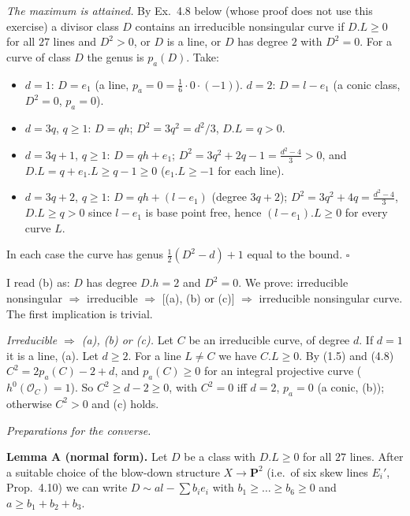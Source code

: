 \documentclass[11pt]{article}
\begin{document}
\emph{The maximum is attained.} By Ex.~4.8 below (whose proof does not use this exercise) a divisor class $D$ contains an irreducible nonsingular curve if $D.L\ge0$ for all $27$ lines and $D^2>0$, or $D$ is a line, or $D$ has degree $2$ with $D^2=0$. For a curve of class $D$ the genus is $p_a(D)$. Take:
\begin{itemize}
\item $d=1$: $D=e_1$ (a line, $p_a=0=\frac16\cdot0\cdot(-1)$). $d=2$: $D=l-e_1$ (a conic class, $D^2=0$, $p_a=0$).
\item $d=3q$, $q\ge1$: $D=qh$; $D^2=3q^2=d^2/3$, $D.L=q>0$.
\item $d=3q+1$, $q\ge1$: $D=qh+e_1$; $D^2=3q^2+2q-1=\frac{d^2-4}3>0$, and $D.L=q+e_1.L\ge q-1\ge0$ ($e_1.L\ge-1$ for each line).
\item $d=3q+2$, $q\ge1$: $D=qh+(l-e_1)$ (degree $3q+2$); $D^2=3q^2+4q=\frac{d^2-4}3$, $D.L\ge q>0$ since $l-e_1$ is base point free, hence $(l-e_1).L\ge0$ for every curve $L$.
\end{itemize}
In each case the curve has genus $\frac12(D^2-d)+1$ equal to the bound. \hfill$\square$

\pf
I read (b) as: $D$ has degree $D.h=2$ and $D^2=0$. We prove: irreducible nonsingular $\Rightarrow$ irreducible $\Rightarrow$ [(a), (b) or (c)] $\Rightarrow$ irreducible nonsingular curve. The first implication is trivial.

\emph{Irreducible $\Rightarrow$ (a), (b) or (c).} Let $C$ be an irreducible curve, of degree $d$. If $d=1$ it is a line, (a). Let $d\ge2$. For a line $L\ne C$ we have $C.L\ge0$. By (1.5) and (4.8) $C^2=2p_a(C)-2+d$, and $p_a(C)\ge0$ for an integral projective curve ($h^0(\mathcal O_C)=1$). So $C^2\ge d-2\ge0$, with $C^2=0$ iff $d=2$, $p_a=0$ (a conic, (b)); otherwise $C^2>0$ and (c) holds.

\emph{Preparations for the converse.}

\textbf{Lemma A (normal form).} Let $D$ be a class with $D.L\ge0$ for all $27$ lines. After a suitable choice of the blow-down structure $X\to\mathbf P^2$ (i.e.\ of six skew lines $E_i'$, Prop.~4.10) we can write $D\sim al-\sum b_ie_i$ with $b_1\ge\dots\ge b_6\ge0$ and $a\ge b_1+b_2+b_3$.
\end{document}
